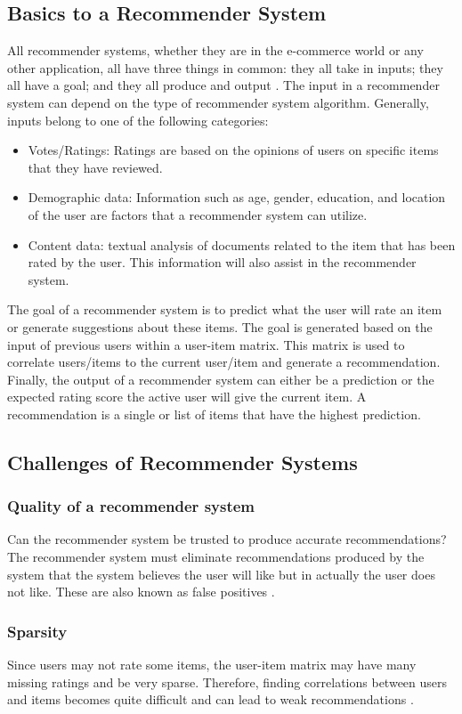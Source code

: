 \subsection{Basics to a Recommender System}
All recommender systems, whether they are in the e-commerce world or any other application, all have three things in common: they all take in inputs; they all have a goal; and they all produce and output \citep{literature_5}.
The input in a recommender system can depend on the type of recommender system algorithm. Generally, inputs belong to one of the following categories:
\begin{itemize}
\item {Votes/Ratings: Ratings are based on the opinions of users on specific items that they have reviewed.}
\item {Demographic data: Information such as age, gender, education, and location of the user are factors that a recommender system can utilize.}
\item {Content data: textual analysis of documents related to the item that has been rated by the user. This information will also assist in the recommender system.}
\end{itemize}
The goal of a recommender system is to predict what the user will rate an item or generate suggestions about these items. The goal is generated based on the input of previous users within a user-item matrix. This matrix is used to correlate users/items to the current user/item and generate a recommendation. 
Finally, the output of a recommender system can either be a prediction or the expected rating score the active user will give the current item. A recommendation is a single or list of items that have the highest prediction.
\subsection{Challenges of Recommender Systems}
\subsubsection{Quality of a recommender system}
Can the recommender system be trusted to produce accurate recommendations? The recommender system must eliminate recommendations produced by the system that the system believes the user will like but in actually the user does not like. These are also known as false positives \citep{literature_5}.
\subsubsection{Sparsity}
Since users may not rate some items, the user-item matrix may have many missing ratings and be very sparse. Therefore, finding correlations between users and items becomes quite difficult and can lead to weak recommendations \citep{literature_6}. 

